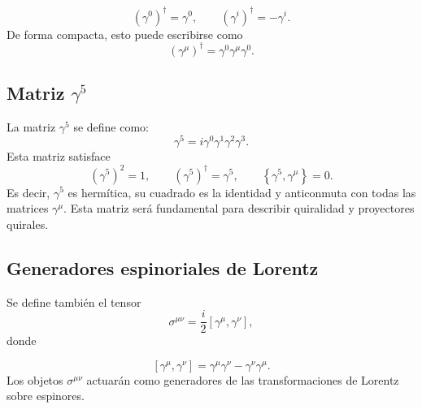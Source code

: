 \documentclass[a4paper,11pt]{book} %
\begin{document}
\begin{equation}
    \left(\gamma^0\right)^\dagger = \gamma^0,
    \qquad
    \left(\gamma^i\right)^\dagger = -\gamma^i.
\end{equation}
\noindent
De forma compacta, esto puede escribirse como
\begin{equation}
    \left(\gamma^\mu\right)^\dagger
    =
    \gamma^0\gamma^\mu\gamma^0.
\end{equation}
\subsection{Matriz \texorpdfstring{\(\gamma^5\)}{gamma5}}
\noindent
La matriz \(\gamma^5\) se define como:
\begin{equation}
    \gamma^5
    =
    i\gamma^0\gamma^1\gamma^2\gamma^3.
\end{equation}
\noindent
Esta matriz satisface
\begin{equation}
    \left(\gamma^5\right)^2 = 1,
    \qquad
    \left(\gamma^5\right)^\dagger = \gamma^5,
    \qquad
    \left\{\gamma^5,\gamma^\mu\right\} = 0.
\end{equation}
\noindent
Es decir, \(\gamma^5\) es hermítica, su cuadrado es la identidad y anticonmuta
con todas las matrices \(\gamma^\mu\). Esta matriz será fundamental para
describir quiralidad y proyectores quirales.

\subsection{Generadores espinoriales de Lorentz}
\noindent
Se define también el tensor
\begin{equation}
    \sigma^{\mu\nu}
    =
    \frac{i}{2}
    \left[
        \gamma^\mu,\gamma^\nu
    \right],
\end{equation}
\noindent
donde

\begin{equation}
    \left[
        \gamma^\mu,\gamma^\nu
    \right]
    =
    \gamma^\mu\gamma^\nu
    -
    \gamma^\nu\gamma^\mu.
\end{equation}
\noindent
Los objetos \(\sigma^{\mu\nu}\) actuarán como generadores de
las transformaciones de Lorentz sobre espinores.
\end{document}
